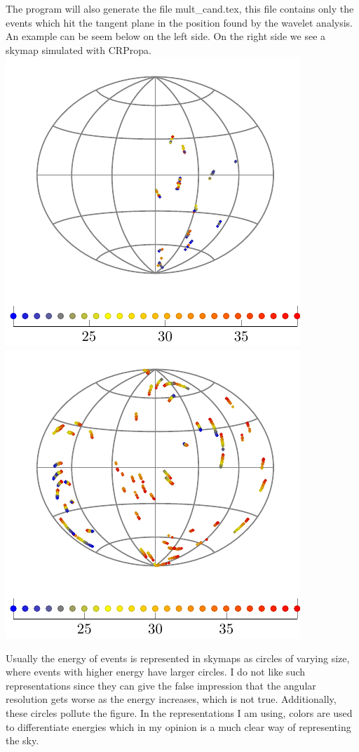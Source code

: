 \documentclass[12pt]{article}
\begin{document}
The program will also generate the file mult\_cand.tex, this file contains only
the events which hit the tangent plane in the position found by the wavelet
analysis. An example can be seem below on the left side. On the right side we
see a skymap simulated with CRPropa. \\
\includegraphics[scale=1.0]{mult-cand.pdf} 
\includegraphics[scale=1.0]{crpropa.pdf}

Usually the energy of events is represented in skymaps as circles of varying
size, where events with higher energy have larger circles. I do not like such
representations since they can give the false impression that the angular
resolution gets worse as the energy increases, which is not true. Additionally,
these circles pollute the figure. In the representations I am using, colors
are used to differentiate energies which in my opinion is a much clear way of
representing the sky.
\end{document}
